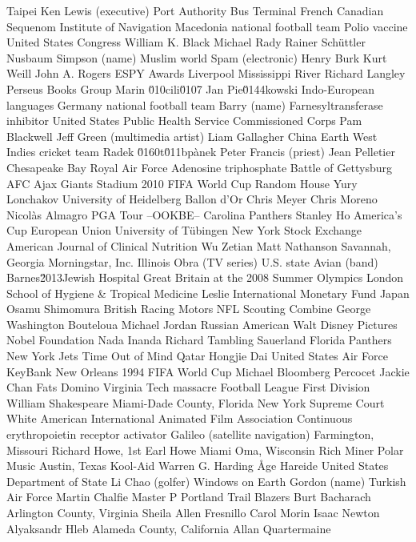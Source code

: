 Taipei  Ken Lewis (executive)  Port Authority Bus Terminal  
French Canadian  Sequenom  Institute of Navigation  
Macedonia national football team  Polio vaccine  United States Congress  
William K. Black  Michael Rady  Rainer Schüttler  
Nusbaum  Simpson (name)  Muslim world  
Spam (electronic)  Henry Burk  Kurt Weill  
John A. Rogers  ESPY Awards  Liverpool  
Mississippi River  Richard Langley  Perseus Books Group  
Marin \u010cili\u0107  Jan Pie\u0144kowski  Indo-European languages  
Germany national football team  Barry (name)  Farnesyltransferase inhibitor  
United States Public Health Service Commissioned Corps  Pam Blackwell  Jeff Green (multimedia artist)  
Liam Gallagher  China  Earth  
West Indies cricket team  Radek \u0160t\u011bpànek  Peter Francis (priest)  
Jean Pelletier  Chesapeake Bay  Royal Air Force  
Adenosine triphosphate  Battle of Gettysburg  AFC Ajax  
Giants Stadium  2010 FIFA World Cup  Random House  
Yury Lonchakov  University of Heidelberg  Ballon d'Or  
Chris Meyer  Chris Moreno  Nicolàs Almagro  
PGA Tour  --OOKBE--  Carolina Panthers  
Stanley Ho  America's Cup  European Union  
University of Tübingen  New York Stock Exchange  American Journal of Clinical Nutrition  
Wu Zetian  Matt Nathanson  Savannah, Georgia  
Morningstar, Inc.  Illinois  Obra (TV series)  
U.S. state  Avian (band)  Barnes\u2013Jewish Hospital  
Great Britain at the 2008 Summer Olympics  London School of Hygiene & Tropical Medicine  Leslie  
International Monetary Fund  Japan  Osamu Shimomura  
British Racing Motors  NFL Scouting Combine  George Washington  
Bouteloua  Michael Jordan  Russian American  
Walt Disney Pictures  Nobel Foundation  Nada Inanda  
Richard Tambling  Sauerland  Florida Panthers  
New York Jets  Time Out of Mind  Qatar  
Hongjie Dai  United States Air Force  KeyBank  
New Orleans  1994 FIFA World Cup  Michael Bloomberg  
Percocet  Jackie Chan  Fats Domino  
Virginia Tech massacre  Football League First Division  William Shakespeare  
Miami-Dade County, Florida  New York Supreme Court  White American  
International Animated Film Association  Continuous erythropoietin receptor activator  Galileo (satellite navigation)  
Farmington, Missouri  Richard Howe, 1st Earl Howe  Miami  
Oma, Wisconsin  Rich Miner  Polar Music  
Austin, Texas  Kool-Aid  Warren G. Harding  
Åge Hareide  United States Department of State  Li Chao (golfer)  
Windows on Earth  Gordon (name)  Turkish Air Force  
Martin Chalfie  Master P  Portland Trail Blazers  
Burt Bacharach  Arlington County, Virginia  Sheila Allen  
Fresnillo  Carol Morin  Isaac Newton  
Alyaksandr Hleb  Alameda County, California  Allan Quartermaine  
